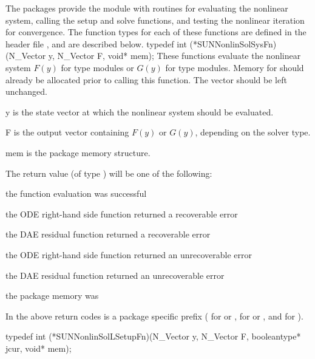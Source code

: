 The {\sundials} packages provide the {\sunnonlinsol} module with
routines for evaluating the nonlinear system, calling the {\sunlinsol}
setup and solve functions, and testing the nonlinear iteration for
convergence. The function types for each of these functions are
defined in the header file ,
and are described below. 
{
  typedef int (*SUNNonlinSolSysFn)(N\_Vector y, N\_Vector F, void* mem);
}
{
  These functions evaluate the nonlinear system $F(y)$
  for  type modules or $G(y)$
  for  type modules. Memory
  for  should already be allocated prior to calling this
  function. The vector  should be left unchanged.
}
{
  \begin{args}[mem]
  \item[y]
    is the state vector at which the nonlinear system should be evaluated.
  \item[F]
    is the output vector containing $F(y)$ or $G(y)$, depending on the
    solver type.
  \item[mem]
    is the {\sundials} package memory structure.
  \end{args}
}
{
  The return value  (of type ) will be one of the
  following:
  \begin{args}
  \item[\id{*\_SUCCESS}]
    the function evaluation was successful
  \item[\id{*\_RHSFUNC\_RECVR}]
    the ODE right-hand side function returned a recoverable error
  \item[\id{*\_RES\_RECVR}]
    the DAE residual function returned a recoverable error
  \item[\id{*\_RHSFUNC\_FAIL}]
    the ODE right-hand side function returned an unrecoverable error
  \item[\id{*\_RES\_FAIL}]
    the DAE residual function returned an unrecoverable error
  \item[\id{*\_MEM\_NULL}]
    the {\sundials} package memory was 
  \end{args}
  In the above return codes \id{*} is a {\sundials} package specific
  prefix ( for {\cvode} or {\cvodes},  for {\ida} or
  {\idas}, and  for {\arkode}).
}
{}
{
  typedef int (*SUNNonlinSolLSetupFn)(N\_Vector y, N\_Vector F, booleantype* jcur, void* mem);
}
